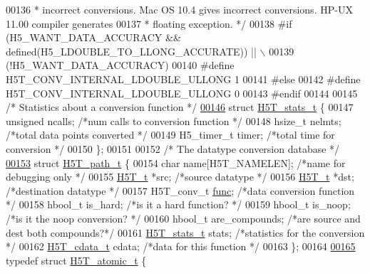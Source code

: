 \begin{DoxyCode}
00136 \textcolor{comment}{ * incorrect conversions.  Mac OS 10.4 gives incorrect conversions. HP-UX 11.00 compiler generates}
00137 \textcolor{comment}{ * floating exception. */}
00138 \textcolor{preprocessor}{#if (H5\_WANT\_DATA\_ACCURACY && defined(H5\_LDOUBLE\_TO\_LLONG\_ACCURATE)) || \(\backslash\)}
00139 \textcolor{preprocessor}{    (!H5\_WANT\_DATA\_ACCURACY)}
00140 \textcolor{preprocessor}{#define H5T\_CONV\_INTERNAL\_LDOUBLE\_ULLONG         1}
00141 \textcolor{preprocessor}{#else}
00142 \textcolor{preprocessor}{#define H5T\_CONV\_INTERNAL\_LDOUBLE\_ULLONG         0}
00143 \textcolor{preprocessor}{#endif}
00144 
00145 \textcolor{comment}{/* Statistics about a conversion function */}
\hyperlink{struct_h5_t__stats__t}{00146} \textcolor{keyword}{struct }\hyperlink{struct_h5_t__stats__t}{H5T\_stats\_t} \{
00147     \textcolor{keywordtype}{unsigned}    ncalls;         \textcolor{comment}{/*num calls to conversion function   */}
00148     hsize\_t nelmts;         \textcolor{comment}{/*total data points converted        */}
00149     H5\_timer\_t  timer;          \textcolor{comment}{/*total time for conversion      */}
00150 \};
00151 
00152 \textcolor{comment}{/* The datatype conversion database */}
\hyperlink{struct_h5_t__path__t}{00153} \textcolor{keyword}{struct }\hyperlink{struct_h5_t__path__t}{H5T\_path\_t} \{
00154     \textcolor{keywordtype}{char}    name[H5T\_NAMELEN];  \textcolor{comment}{/*name for debugging only        */}
00155     \hyperlink{struct_h5_t__t}{H5T\_t}  *src;           \textcolor{comment}{/*source datatype            */}
00156     \hyperlink{struct_h5_t__t}{H5T\_t}  *dst;           \textcolor{comment}{/*destination datatype           */}
00157     H5T\_conv\_t  \hyperlink{structfunc}{func};           \textcolor{comment}{/*data conversion function       */}
00158     hbool\_t is\_hard;        \textcolor{comment}{/*is it a hard function?         */}
00159     hbool\_t is\_noop;        \textcolor{comment}{/*is it the noop conversion?         */}
00160     hbool\_t are\_compounds;      \textcolor{comment}{/*are source and dest both compounds?*/}
00161     \hyperlink{struct_h5_t__stats__t}{H5T\_stats\_t}  stats;          \textcolor{comment}{/*statistics for the conversion      */}
00162     \hyperlink{struct_h5_t__cdata__t}{H5T\_cdata\_t}  cdata;          \textcolor{comment}{/*data for this function         */}
00163 \};
00164 
\hyperlink{struct_h5_t__atomic__t}{00165} \textcolor{keyword}{typedef} \textcolor{keyword}{struct }\hyperlink{struct_h5_t__atomic__t}{H5T\_atomic\_t} \{

\end{DoxyCode}
